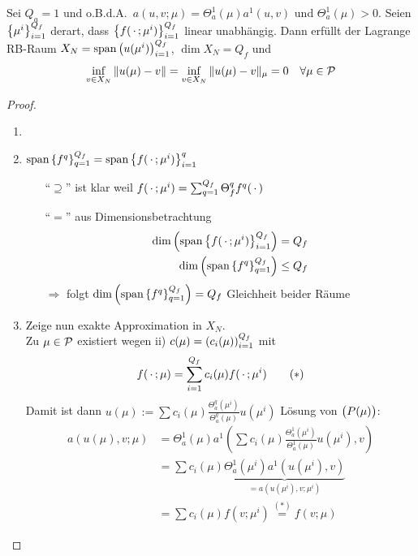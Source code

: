 \begin{satz}[Optimales $X_N$ für $Q_a=1$]
	Sei $Q_a=1$ und o.B.d.A.\ $a(u,v;\mu) = \Theta_a^1(\mu) a^1(u,v)$ und $\Theta_a^1(\mu) > 0$. Seien $\left\{\mu^i\right\}_{i=1}^{Q_f}$ derart, dass $\left\{f(\,\cdot\,;\mu^i)\right\}_{i=1}^{Q_f}$ linear unabhängig. Dann erfüllt der Lagrange RB-Raum $X_N = \operatorname{span}\left(u(\mu^i)\right)_{i=1}^{Q_f}$, $\dim X_N = Q_f$ und
	\[
		\inf_{v \in X_N} \|u(\mu)-v\| = \inf_{v \in X_N} \|u(\mu)-v\|_\mu = 0 \quad \forall \mu \in \mathcal{P}
	\]

	\begin{proof} \beginwithlistbew
		\begin{enumerate}
			\item \checkmark
			\item $\operatorname{span}\left\{f^q\right\}_{q=1}^{Q_f} = \operatorname{span}\left\{f(\,\cdot\,;\mu^i)\right\}_{i=1}^q$
				\begin{itemize}
					\item[``$\supseteq$''] ist klar weil $f(\,\cdot\,;\mu^i) = \sum_{q=1}^{Q_f} \Theta_f^q f^q(\,\cdot\,)$
					\item[``$=$''] aus Dimensionsbetrachtung
						\begin{align*}
							\dim\left( \operatorname{span}\left\{f(\,\cdot\,;\mu^i)\right\}_{i=1}^{Q_f} \right) &= Q_f\\
							\dim\left( \operatorname{span}\left\{f^q\right\}_{q=1}^{Q_f} \right) &\leq Q_f
						\end{align*}
						$\Rightarrow$ folgt $\dim\left( \operatorname{span}\left\{f^q\right\}_{q=1}^{Q_f} \right) = Q_f$ Gleichheit beider Räume
				\end{itemize}
			\item Zeige nun exakte Approximation in $X_N$.\\
				Zu $\mu \in \mathcal{P}$ existiert wegen ii) $c(\mu) = \left(c_i(\mu)\right)_{i=1}^{Q_f}$ mit
				\[
					f(\,\cdot\,;\mu) = \sum_{i=1}^{Q_f} c_i(\mu) f(\,\cdot\,;\mu^i) \tag{$*$}
				\]
				Damit ist dann $u(\mu) := \sum c_i(\mu) \frac{\Theta_a^q(\mu^i)}{\Theta_a^q(\mu)} u(\mu^i)$ Lösung von $\big(P(\mu)\big)$:
				\begin{align*}
					a(u(\mu),v;\mu) &= \Theta_a^1(\mu) a^1(\sum c_i(\mu) \frac{\Theta_a^1(\mu^i)}{\Theta_a^1(\mu)} u(\mu^i), v)\\
					&= \sum c_i(\mu) \underbrace{\Theta_a^1(\mu^i) a^1(u(\mu^i),v)}_{=a(u(\mu^i),v;\mu^i)}\\
					&= \sum c_i(\mu) f(v;\mu^i) \stackrel{(*)}{=} f(v;\mu)
				\end{align*}
		\end{enumerate}
	\end{proof}
\end{satz}

